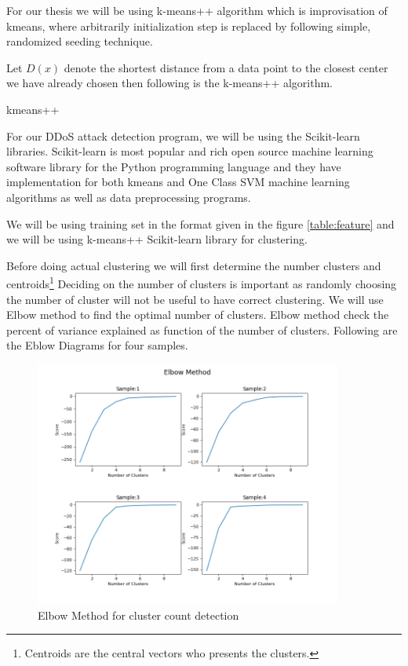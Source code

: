 \documentclass[10pt,oneside,a4paper]{article}
\begin{document}
For our thesis we will be using k-means++ algorithm\cite{k-means++} which is improvisation of kmeans, where arbitrarily initialization step is replaced by following simple, randomized seeding technique.

Let $D(x)$ denote the shortest distance from a data point to the closest center we have already chosen then following is the k-means++ algorithm.

\begin{algorithm}
\caption{kmeans++}\label{kmeans++}
\begin{algorithmic}[1]
\end{algorithmic}
\end{algorithm}

For our DDoS attack detection program, we will be using the Scikit-learn libraries. Scikit-learn is most popular and rich open source machine learning software library for the Python programming language and they have implementation for both kmeans and One Class SVM machine learning algorithms as well as data preprocessing programs.

We will be using training set in the format given in the figure \ref{table:feature} and we will be using k-means++ Scikit-learn library for clustering.

Before doing actual clustering we will first determine the number clusters and centroids\footnote{Centroids are the central vectors who presents the clusters.} Deciding on the number of clusters is important as randomly choosing the number of cluster will not be useful to have correct clustering. We will use Elbow method to find the optimal number of clusters. Elbow method check the percent of variance explained as function of the number of clusters. Following are the Eblow Diagrams for four samples.

\begin{figure}[H]
\centering
\includegraphics[width=0.90\textwidth]{elbow-method}
\caption{Elbow Method for cluster count detection} \label{fig:elbowmethod}
\end{figure}
\end{document}
